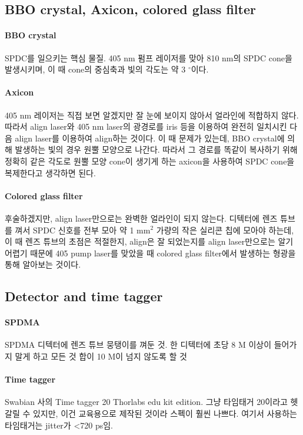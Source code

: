 \subsection{BBO crystal, Axicon, colored glass filter}
\paragraph{BBO crystal}
SPDC를 일으키는 핵심 물질. 405 nm 펌프 레이저를 맞아 810 nm의 SPDC cone을 발생시키며, 이 때 cone의 중심축과 빛의 각도는 약 3 $^\circ$이다.
\paragraph{Axicon}
405 nm 레이저는 직접 보면 알겠지만 잘 눈에 보이지 않아서 얼라인에 적합하지 않다. 따라서 align laser와 405 nm laser의 광경로를 iris 등을 이용하여 완전히 일치시킨 다음 align laser를 이용하여 align하는 것이다. 이 때 문제가 있는데, BBO crystal에 의해 발생하는 빛의 경우 원뿔 모양으로 나간다. 따라서 그 경로를 똑같이 복사하기 위해 정확히 같은 각도로 원뿔 모양 cone이 생기게 하는 axicon을 사용하여 SPDC cone을 복제한다고 생각하면 된다.
\paragraph{Colored glass filter}
후술하겠지만, align laser만으로는 완벽한 얼라인이 되지 않는다. 디텍터에 렌즈 튜브를 껴서 SPDC 신호를 전부 모아 약 1 mm$^2$ 가량의 작은 실리콘 칩에 모아야 하는데, 이 때 렌즈 튜브의 초점은 적절한지, align은 잘 되었는지를 align laser만으로는 알기 어렵기 때문에 405 pump laser를 맞았을 때 colored glass filter에서 발생하는 형광을 통해 알아보는 것이다.

\subsection{Detector and time tagger}
\paragraph{SPDMA}
SPDMA 디텍터에 렌즈 튜브 뭉탱이를 껴둔 것. 한 디텍터에 초당 8 M 이상이 들어가지 말게 하고 모든 것 합이 10 M이 넘지 않도록 할 것
\paragraph{Time tagger}
Swabian 사의 Time tagger 20 Thorlabs edu kit edition. 그냥 타임태거 20이라고 헷갈릴 수 있지만, 이건 교육용으로 제작된 것이라 스펙이 훨씬 나쁘다. 여기서 사용하는 타임태거는 jitter가 <720 ps임.

